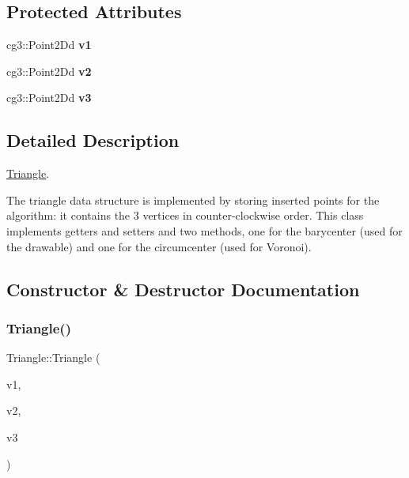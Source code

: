 \subsection*{Protected Attributes}
\begin{DoxyCompactItemize}
\item 
\mbox{\label{classTriangle_ac28fb730b25c0d52aac1d0faf12b1225}} 
cg3\+::\+Point2\+Dd {\bfseries v1}
\item 
\mbox{\label{classTriangle_a6d59f8e4f22f7436b6298051d24ae977}} 
cg3\+::\+Point2\+Dd {\bfseries v2}
\item 
\mbox{\label{classTriangle_a8eb4459eb8ead2fc99742e2846d59264}} 
cg3\+::\+Point2\+Dd {\bfseries v3}
\end{DoxyCompactItemize}


\subsection{Detailed Description}
\hyperlink{classTriangle}{Triangle}. 

The triangle data structure is implemented by storing inserted points for the algorithm\+: it contains the 3 vertices in counter-\/clockwise order. This class implements getters and setters and two methods, one for the barycenter (used for the drawable) and one for the circumcenter (used for Voronoi). 

\subsection{Constructor \& Destructor Documentation}
\mbox{\label{classTriangle_a3bb081f3c4d90284e27e1005a2b33599}} 
\subsubsection{\texorpdfstring{Triangle()}{Triangle()}}
{\footnotesize\ttfamily Triangle\+::\+Triangle (\begin{DoxyParamCaption}\item[{const cg3\+::\+Point2\+Dd \&}]{v1,  }\item[{const cg3\+::\+Point2\+Dd \&}]{v2,  }\item[{const cg3\+::\+Point2\+Dd \&}]{v3 }\end{DoxyParamCaption})}



